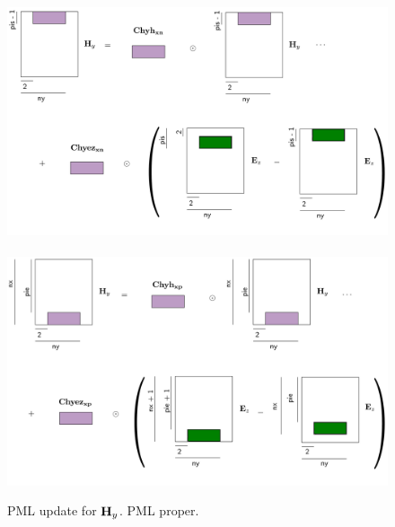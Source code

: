 \documentclass[a4paper,12pt]{article}
\begin{document}
%
\begin{figure}
\centering
\includegraphics[width=1\textwidth]{../pics/tikz/svg/pml-color/Hy-pml-xn.pdf}
~
\includegraphics[width=1\textwidth]{../pics/tikz/svg/pml-color/Hy-pml-xp.pdf}
\caption{PML update for ${\bf H}_y$. PML proper.}
\end{figure}
%
%
\end{document}
